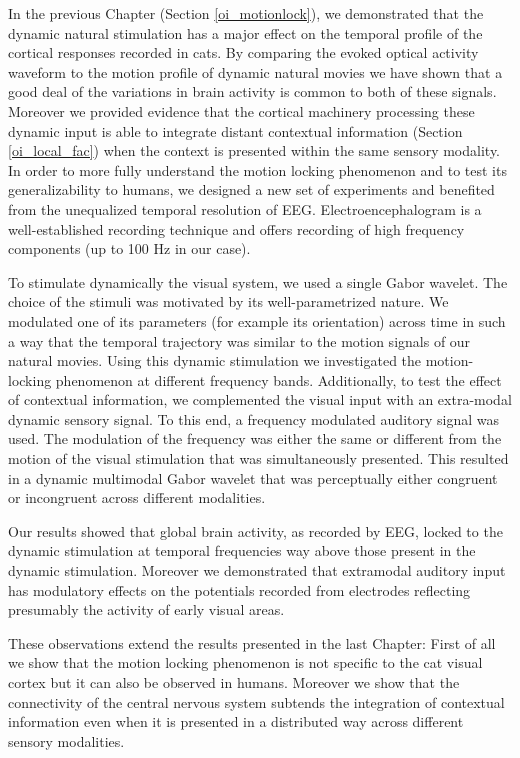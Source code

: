 In the previous Chapter (Section \ref{oi_motionlock}), we demonstrated that
the dynamic natural stimulation has a major effect on the temporal profile
of the cortical responses recorded in cats. By comparing the evoked optical
activity waveform to the motion profile of dynamic natural movies we have
shown that a good deal of the variations in brain activity is common to
both of these signals. Moreover we provided evidence that the cortical
machinery processing these dynamic input is able to integrate distant
contextual information (Section \ref{oi_local_fac}) when the context is
presented within the same sensory modality. In order to more fully
understand the motion locking phenomenon \citep{kayser2004b} and to test
its generalizability to humans, we designed a new set of experiments and
benefited from the unequalized temporal resolution of EEG.
Electroencephalogram is a well-established recording technique and offers
recording of high frequency components (up to 100 Hz in our case).

To stimulate dynamically the visual system, we used a single Gabor wavelet.
The choice of the stimuli was motivated by its well-parametrized nature. We
modulated one of its parameters (for example its orientation) across time
in such a way that the temporal trajectory was similar to the motion
signals of our natural movies. Using this dynamic stimulation we
investigated the motion-locking phenomenon at different frequency bands.
Additionally, to test the effect of contextual information, we complemented
the visual input with an extra-modal dynamic sensory signal. To this end, a
frequency modulated auditory signal was used. The modulation of the
frequency was either the same or different from the motion of the visual
stimulation that was simultaneously presented. This resulted in a dynamic
multimodal Gabor wavelet that was perceptually either congruent or
incongruent across different modalities. 

Our results showed that global brain activity, as recorded by EEG, locked
to the dynamic stimulation at temporal frequencies way above those present
in the dynamic stimulation. Moreover we demonstrated that extramodal
auditory input has modulatory effects on the potentials recorded from
electrodes reflecting presumably the activity of early visual areas. 

These observations extend the results presented in the last Chapter: First
of all we show that the motion locking phenomenon is not specific to the
cat visual cortex but it can also be observed in humans. Moreover we show
that the connectivity of the central nervous system subtends the
integration of contextual information even when it is presented in a
distributed way across different sensory modalities.
